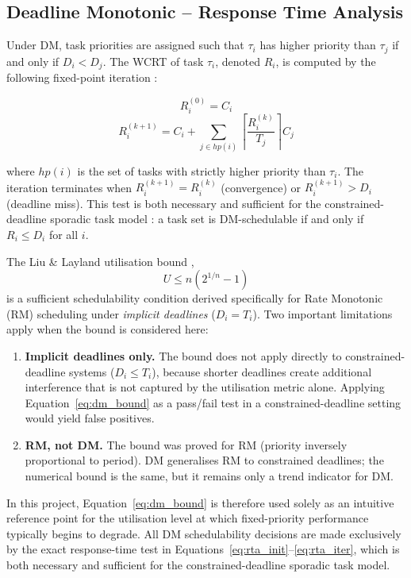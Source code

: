 \documentclass[12pt,a4paper]{article}
\begin{document}
\subsection{Deadline Monotonic -- Response Time Analysis}

Under DM, task priorities are assigned such that \(\tau_i\) has higher priority than \(\tau_j\) if and only if \(D_i < D_j\). The WCRT of task \(\tau_i\), denoted \(R_i\), is computed by the following fixed-point iteration \cite{buttazzo2011}:

\begin{equation}
    R_i^{(0)} = C_i
    \label{eq:rta_init}
\end{equation}
\begin{equation}
    R_i^{(k+1)} = C_i + \sum_{j \in hp(i)} \left\lceil \frac{R_i^{(k)}}{T_j} \right\rceil C_j
    \label{eq:rta_iter}
\end{equation}

where \(hp(i)\) is the set of tasks with strictly higher priority than \(\tau_i\). The iteration terminates when \(R_i^{(k+1)} = R_i^{(k)}\) (convergence) or \(R_i^{(k+1)} > D_i\) (deadline miss). This test is both necessary and sufficient for the constrained-deadline sporadic task model \cite{joseph1986}: a task set is DM-schedulable if and only if \(R_i \leq D_i\) for all \(i\).

The Liu \& Layland utilisation bound \cite{liu1973},
\begin{equation}
    U \leq n\left(2^{1/n} - 1\right)
    \label{eq:dm_bound}
\end{equation}
is a sufficient schedulability condition derived specifically for Rate Monotonic (RM) scheduling under \emph{implicit deadlines} (\(D_i = T_i\)). Two important limitations apply when the bound is considered here:
\begin{enumerate}
    \item \textbf{Implicit deadlines only.} The bound does not apply directly to constrained-deadline systems (\(D_i \leq T_i\)), because shorter deadlines create additional interference that is not captured by the utilisation metric alone. Applying Equation~\ref{eq:dm_bound} as a pass/fail test in a constrained-deadline setting would yield false positives.
    \item \textbf{RM, not DM.} The bound was proved for RM (priority inversely proportional to period). DM generalises RM to constrained deadlines; the numerical bound is the same, but it remains only a trend indicator for DM.
\end{enumerate}
In this project, Equation~\ref{eq:dm_bound} is therefore used solely as an intuitive reference point for the utilisation level at which fixed-priority performance typically begins to degrade. All DM schedulability decisions are made exclusively by the exact response-time test in Equations~\ref{eq:rta_init}--\ref{eq:rta_iter}, which is both necessary and sufficient for the constrained-deadline sporadic task model.
\end{document}
